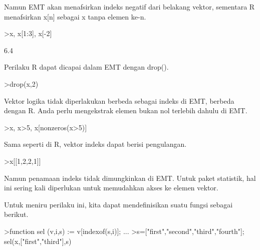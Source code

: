 \documentclass[a4paper,10pt]{article}
\begin{document}
\begin{eulernotebook}
\begin{eulercomment}
\begin{eulercomment}
\begin{eulercomment}
\begin{eulercomment}
\begin{eulercomment}
\begin{eulercomment}
\begin{eulercomment}
Namun EMT akan menafsirkan indeks negatif dari belakang vektor,
sementara R menafsirkan x[n] sebagai x tanpa elemen ke-n.
\end{eulercomment}
\begin{eulerprompt}
>x, x[1:3], x[-2]
\end{eulerprompt}
\begin{euleroutput}
  [10.4,  5.6,  3.1,  6.4,  21.7]
  [10.4,  5.6,  3.1]
  6.4
\end{euleroutput}
\begin{eulercomment}
Perilaku R dapat dicapai dalam EMT dengan drop().
\end{eulercomment}
\begin{eulerprompt}
>drop(x,2)
\end{eulerprompt}
\begin{euleroutput}
  [10.4,  3.1,  6.4,  21.7]
\end{euleroutput}
\begin{eulercomment}
Vektor logika tidak diperlakukan berbeda sebagai indeks di EMT,
berbeda dengan R. Anda perlu mengekstrak elemen bukan nol terlebih
dahulu di EMT.
\end{eulercomment}
\begin{eulerprompt}
>x, x>5, x[nonzeros(x>5)]
\end{eulerprompt}
\begin{euleroutput}
  [10.4,  5.6,  3.1,  6.4,  21.7]
  [1,  1,  0,  1,  1]
  [10.4,  5.6,  6.4,  21.7]
\end{euleroutput}
\begin{eulercomment}
Sama seperti di R, vektor indeks dapat berisi pengulangan.
\end{eulercomment}
\begin{eulerprompt}
>x[[1,2,2,1]]
\end{eulerprompt}
\begin{euleroutput}
  [10.4,  5.6,  5.6,  10.4]
\end{euleroutput}
\begin{eulercomment}
Namun penamaan indeks tidak dimungkinkan di EMT. Untuk paket
statistik, hal ini sering kali diperlukan untuk memudahkan akses ke
elemen vektor.

Untuk meniru perilaku ini, kita dapat mendefinisikan suatu fungsi
sebagai berikut.
\end{eulercomment}
\begin{eulerprompt}
>function sel (v,i,s) := v[indexof(s,i)]; ...
>s=["first","second","third","fourth"]; sel(x,["first","third"],s)
\end{eulerprompt}
\begin{euleroutput}
  

\end{euleroutput}
\end{eulercomment}
\end{eulercomment}
\end{eulercomment}
\end{eulercomment}
\end{eulercomment}
\end{eulercomment}
\end{eulernotebook}
\end{document}
